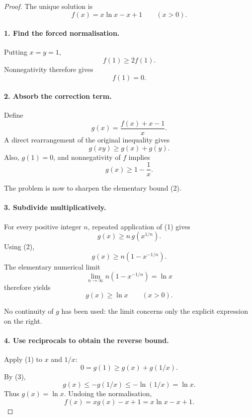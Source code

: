
\begin{dlsummary}[title={\bfseries Solution 61. The Hidden Entropy Function},breakable]

\begin{proof}
The unique solution is
\[
\boxed{f(x)=x\ln x-x+1\qquad(x>0).}
\]

\paragraph{1. Find the forced normalisation.}

Putting \(x=y=1\),
\[
f(1)\ge2f(1).
\]
Nonnegativity therefore gives
\[
f(1)=0.
\]

\paragraph{2. Absorb the correction term.}

Define
\[
g(x)=\frac{f(x)+x-1}{x}.
\]
A direct rearrangement of the original inequality gives
\[
\boxed{g(xy)\ge g(x)+g(y).} \tag{1}
\]
Also, \(g(1)=0\), and nonnegativity of \(f\) implies
\[
\boxed{g(x)\ge1-\frac1x.} \tag{2}
\]

The problem is now to sharpen the elementary bound (2).

\paragraph{3. Subdivide multiplicatively.}

For every positive integer \(n\), repeated application of (1) gives
\[
g(x)\ge n\,g(x^{1/n}).
\]
Using (2),
\[
g(x)\ge n\left(1-x^{-1/n}\right).
\]
The elementary numerical limit
\[
\lim_{n\to\infty}n\left(1-x^{-1/n}\right)=\ln x
\]
therefore yields
\[
\boxed{g(x)\ge\ln x\qquad(x>0).} \tag{3}
\]

No continuity of \(g\) has been used: the limit concerns only the explicit expression on the right.

\paragraph{4. Use reciprocals to obtain the reverse bound.}

Apply (1) to \(x\) and \(1/x\):
\[
0=g(1)\ge g(x)+g(1/x).
\]
By (3),
\[
g(x)\le-g(1/x)\le-\ln(1/x)=\ln x.
\]
Thus \(g(x)=\ln x\). Undoing the normalisation,
\[
f(x)=xg(x)-x+1=x\ln x-x+1.
\]


\end{proof}
\end{dlsummary}
